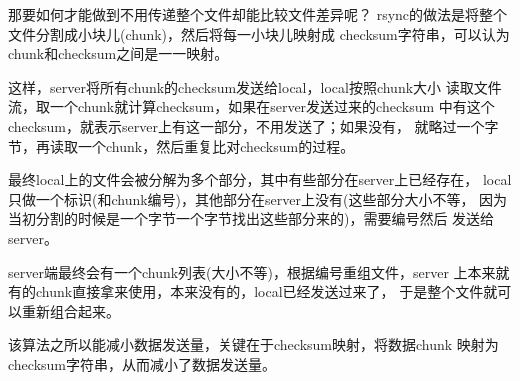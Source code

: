 ﻿\documentclass[a4paper,11pt]{article}
\begin{document}
  那要如何才能做到不用传递整个文件却能比较文件差异呢？
  rsync的做法是将整个文件分割成小块儿(chunk)，然后将每一小块儿映射成
  checksum字符串，可以认为chunk和checksum之间是一一映射。

  这样，server将所有chunk的checksum发送给local，local按照chunk大小
  读取文件流，取一个chunk就计算checksum，如果在server发送过来的checksum
  中有这个checksum，就表示server上有这一部分，不用发送了；如果没有，
  就略过一个字节，再读取一个chunk，然后重复比对checksum的过程。

  最终local上的文件会被分解为多个部分，其中有些部分在server上已经存在，
  local只做一个标识(和chunk编号)，其他部分在server上没有(这些部分大小不等，
  因为当初分割的时候是一个字节一个字节找出这些部分来的)，需要编号然后
  发送给server。

  server端最终会有一个chunk列表(大小不等)，根据编号重组文件，server
  上本来就有的chunk直接拿来使用，本来没有的，local已经发送过来了，
  于是整个文件就可以重新组合起来。

  该算法之所以能减小数据发送量，关键在于checksum映射，将数据chunk
  映射为checksum字符串，从而减小了数据发送量。
  
  
\end{document}
